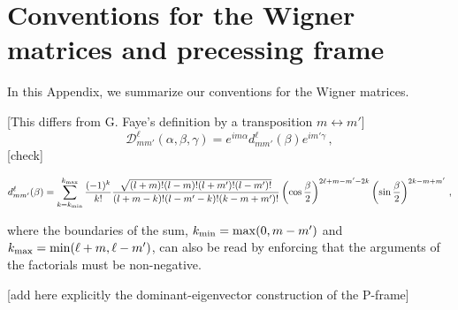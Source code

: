 \documentclass[aps,showpacs,twocolumn,
prd,superscriptaddress,nofootinbib]{revtex4-1}
\newcommand{\be}{\begin{equation}}
\newcommand{\ee}{\end{equation}}
\newcommand\calD{{\mathcal{D}}}
\newcommand{\SM}[1]{{\color{Red} #1}}
\begin{document}
\appendix

\section{Conventions for the Wigner matrices and precessing frame}
\label{app:wigner}

In this Appendix, we summarize our conventions for the Wigner matrices.

\SM{[This differs from G. Faye's definition by a transposition $m\leftrightarrow m'$]}
\be\label{eq:defWignerDapp}
	\calD^{\ell}_{mm'} (\alpha, \beta, \gamma) = e^{im \alpha} d^{\ell}_{mm'}(\beta) e^{im' \gamma}\,,
\ee
\SM{[check]}
\begin{widetext}
\be\label{eq:defWignerdapp}
	d^{\ell}_{mm'}(\beta) = \sum\limits_{k=k_{\rm min}}^{k_{\rm max}} \frac{(-1)^{k}}{k!} \frac{\sqrt{(l+m)! (l-m)! (l+m')! (l-m')!}}{(l+m-k)! (l-m'-k)! (k-m+m')!} \left( \cos\frac{\beta}{2} \right)^{2\ell+m-m'-2k} \left( \sin\frac{\beta}{2} \right)^{2k-m+m'}\,,
\ee
\end{widetext}
where the boundaries of the sum, $k_{\rm min} = \mathrm{max}(0, m-m')$ and $k_{\rm max} = \mathrm{min}(\ell+m, \ell-m')$, can also be read by enforcing that the arguments of the factorials must be non-negative.

\SM{[add here explicitly the dominant-eigenvector construction of the P-frame]}



%

\end{document}
